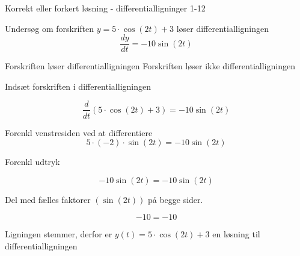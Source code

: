 \documentclass{article}
\begin{document}
\begin{exercise}{Korrekt eller forkert løsning - differentialligninger 1-12}
	
	
	Undersøg om forskriften $y = 5 \cdot \cos(2t) + 3$ løser differentialligningen
	\[
	\frac{dy}{dt} = -10 \sin(2t)
	\]
	
\begin{multichoice}
	\itemtrue Forskriften løser differentialligningen 
	\itemfalse Forskriften løser ikke differentialligningen 
\end{multichoice}
	
	\hint
	
	Indsæt forskriften i differentialligningen
	
	\hint
	\[
	\frac{d}{dt} \left(5 \cdot \cos(2t) + 3\right) = -10 \sin(2t)
	\]
	
	
	\hint
	
	Forenkl venstresiden ved at differentiere
	\[
	5 \cdot (-2) \cdot \sin(2t) = -10 \sin(2t)
	\]
	
	\hint
	
	Forenkl udtryk
	
	\hint
	\[
	-10 \sin(2t) = -10 \sin(2t)
	\]
	
	\hint
	Del med fælles faktorer $\left(  \sin(2t) \right)$ på begge sider.
	
	\hint
	
	\[
	-10 = -10
	\]
	
	
	\hint
	
	Ligningen stemmer, derfor er $y(t) = 5 \cdot \cos(2t) + 3$ en løsning til differentialligningen
	
\end{exercise}
\end{document}
